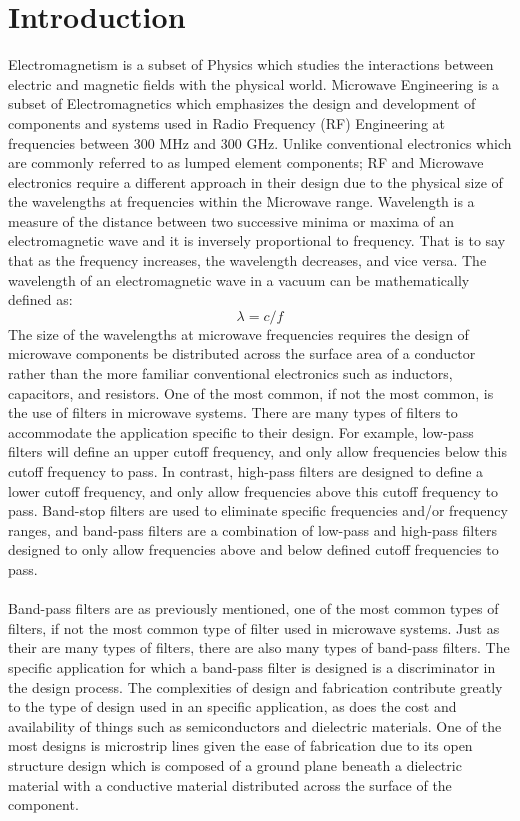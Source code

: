 \documentclass{article}
\begin{document}
\section{Introduction}
Electromagnetism is a subset of Physics which studies the interactions between electric and magnetic fields with the physical world. Microwave Engineering is a subset of Electromagnetics which emphasizes the design and development of components and systems used in Radio Frequency (RF) Engineering at frequencies between 300 MHz and 300 GHz. Unlike conventional electronics which are commonly referred to as lumped element components; RF and Microwave electronics require a different approach in their design due to the physical size of the wavelengths at frequencies within the Microwave range. Wavelength is a measure of the distance between two successive minima or maxima of an electromagnetic wave and it is inversely proportional to frequency. That is to say that as the frequency increases, the wavelength decreases, and vice versa. The wavelength of an electromagnetic wave in a vacuum can be mathematically defined as:
\begin{equation}
    \lambda = c/f
\end{equation}
The size of the wavelengths at microwave frequencies requires the design of microwave components be distributed across the surface area of a conductor rather than the more familiar conventional electronics such as inductors, capacitors, and resistors. One of the most common, if not the most common, is the use of filters in microwave systems. There are many types of filters to accommodate the application specific to their design. For example, low-pass filters will define an upper cutoff frequency, and only allow frequencies below this cutoff frequency to pass. In contrast, high-pass filters are designed to define a lower cutoff frequency, and only allow frequencies above this cutoff frequency to pass. Band-stop filters are used to eliminate specific frequencies and/or frequency ranges, and band-pass filters are a combination of low-pass and high-pass filters designed to only allow frequencies above and below defined cutoff frequencies to pass.\\
\text{ }\\
Band-pass filters are as previously mentioned, one of the most common types of filters, if not the most common type of filter used in microwave systems. Just as their are many types of filters, there are also many types of band-pass filters. The specific application for which a band-pass filter is designed is a discriminator in the design process. The complexities of design and fabrication contribute greatly to the type of design used in an specific application, as does the cost and availability of things such as semiconductors and dielectric materials. One of the most designs is microstrip lines given the ease of fabrication due to its open structure design which is composed of a ground plane beneath a dielectric material with a conductive material distributed across the surface of the component.\\
\end{document}
